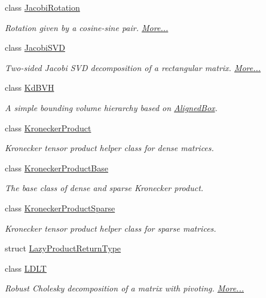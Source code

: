 \begin{DoxyCompactItemize}
class \hyperlink{group___jacobi___module_class_eigen_1_1_jacobi_rotation}{Jacobi\+Rotation}
\begin{DoxyCompactList}\small\item\em Rotation given by a cosine-\/sine pair.  \hyperlink{group___jacobi___module_class_eigen_1_1_jacobi_rotation}{More...}\end{DoxyCompactList}\item 
class \hyperlink{group___s_v_d___module_class_eigen_1_1_jacobi_s_v_d}{Jacobi\+S\+VD}
\begin{DoxyCompactList}\small\item\em Two-\/sided Jacobi S\+VD decomposition of a rectangular matrix.  \hyperlink{group___s_v_d___module_class_eigen_1_1_jacobi_s_v_d}{More...}\end{DoxyCompactList}\item 
class \hyperlink{class_eigen_1_1_kd_b_v_h}{Kd\+B\+VH}
\begin{DoxyCompactList}\small\item\em A simple bounding volume hierarchy based on \hyperlink{group___geometry___module_class_eigen_1_1_aligned_box}{Aligned\+Box}. \end{DoxyCompactList}\item 
class \hyperlink{class_eigen_1_1_kronecker_product}{Kronecker\+Product}
\begin{DoxyCompactList}\small\item\em Kronecker tensor product helper class for dense matrices. \end{DoxyCompactList}\item 
class \hyperlink{class_eigen_1_1_kronecker_product_base}{Kronecker\+Product\+Base}
\begin{DoxyCompactList}\small\item\em The base class of dense and sparse Kronecker product. \end{DoxyCompactList}\item 
class \hyperlink{class_eigen_1_1_kronecker_product_sparse}{Kronecker\+Product\+Sparse}
\begin{DoxyCompactList}\small\item\em Kronecker tensor product helper class for sparse matrices. \end{DoxyCompactList}\item 
struct \hyperlink{struct_eigen_1_1_lazy_product_return_type}{Lazy\+Product\+Return\+Type}
\item 
class \hyperlink{group___cholesky___module_class_eigen_1_1_l_d_l_t}{L\+D\+LT}
\begin{DoxyCompactList}\small\item\em Robust Cholesky decomposition of a matrix with pivoting.  \hyperlink{group___cholesky___module_class_eigen_1_1_l_d_l_t}{More...}\end{DoxyCompactList}\item 

\end{DoxyCompactItemize}
